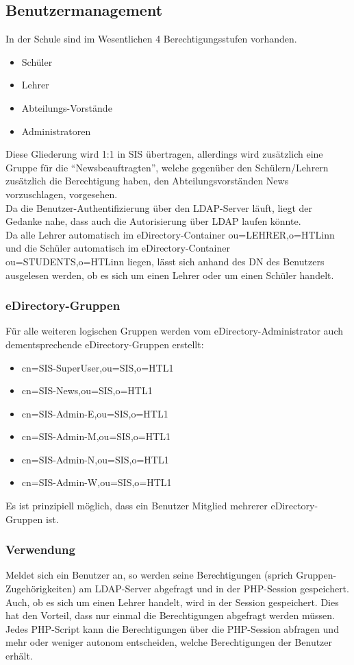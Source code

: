 \subsection{Benutzermanagement}
\label{sec:content_solutions_users}
In der Schule sind im Wesentlichen 4 Berechtigungsstufen vorhanden.
\begin{itemize}
	\item Schüler
	\item Lehrer
	\item Abteilungs-Vorstände
	\item Administratoren
\end{itemize}
Diese Gliederung wird 1:1 in SIS übertragen, allerdings wird zusätzlich eine Gruppe für die \enquote{Newsbeauftragten}, welche gegenüber den Schülern/Lehrern zusätzlich die Berechtigung haben, den Abteilungsvorständen News vorzuschlagen, vorgesehen.\\
Da die Benutzer-Authentifizierung über den LDAP-Server läuft, liegt der Gedanke nahe, dass auch die Autorisierung über LDAP laufen könnte.\\
Da alle Lehrer automatisch im eDirectory-Container ou=LEHRER,o=HTLinn und die Schüler automatisch im eDirectory-Container ou=STUDENTS,o=HTLinn liegen, lässt sich anhand des DN des Benutzers ausgelesen werden, ob es sich um einen Lehrer oder um einen Schüler handelt.\\
\subsubsection{eDirectory-Gruppen}
Für alle weiteren logischen Gruppen werden vom eDirectory-Administrator auch dementsprechende eDirectory-Gruppen erstellt:
\begin{itemize}
	\item cn=SIS-SuperUser,ou=SIS,o=HTL1
	\item cn=SIS-News,ou=SIS,o=HTL1
	\item cn=SIS-Admin-E,ou=SIS,o=HTL1
	\item cn=SIS-Admin-M,ou=SIS,o=HTL1
	\item cn=SIS-Admin-N,ou=SIS,o=HTL1
	\item cn=SIS-Admin-W,ou=SIS,o=HTL1
\end{itemize}
Es ist prinzipiell möglich, dass ein Benutzer Mitglied mehrerer eDirectory-Gruppen ist.\\
\subsubsection{Verwendung}
Meldet sich ein Benutzer an, so werden seine Berechtigungen (sprich Gruppen-Zugehörigkeiten) am LDAP-Server abgefragt und in der PHP-Session gespeichert. Auch, ob es sich um einen Lehrer handelt, wird in der Session gespeichert. Dies hat den Vorteil, dass nur einmal die Berechtigungen abgefragt werden müssen.\\
Jedes PHP-Script kann die Berechtigungen über die PHP-Session abfragen und mehr oder weniger autonom entscheiden, welche Berechtigungen der Benutzer erhält.